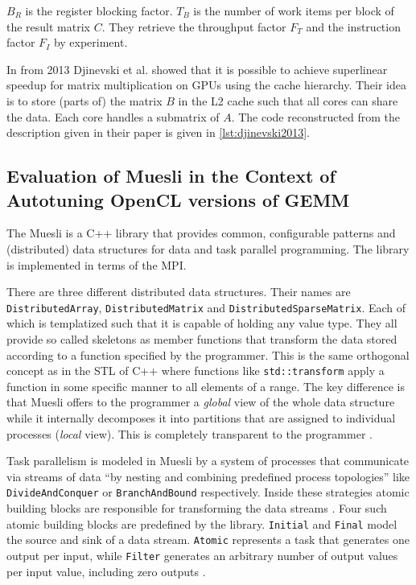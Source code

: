 $B_R$ is the register blocking factor. $T_B$ is the number of work items 
per block of the result matrix $C$. They retrieve the throughput factor $F_T$ 
and the instruction factor $F_I$ by experiment.



In \cite{Djinevski2013} from 2013 Djinevski et al. showed that it is possible 
to achieve superlinear speedup for matrix multiplication on \acp{GPU} using the 
cache hierarchy. Their idea is to store (parts of) the matrix $B$ in the L2 
cache such that all cores can share the data. Each core handles a submatrix of 
$A$. The code reconstructed from the description given in their paper is given 
in \cref{lst:djinevski2013}. 



\subsection{Evaluation of Muesli in the Context of Autotuning OpenCL 
versions of \acs{GEMM}}

The \ac{Muesli} is a C++ library that provides common, 
configurable patterns and (distributed) data structures for data and task 
parallel programming. The library is implemented in terms of the \ac{MPI}.

There are three different distributed data structures. Their names are 
\texttt{DistributedArray}, \texttt{DistributedMatrix} and 
\texttt{DistributedSparseMatrix}. Each of which is templatized such that it 
is capable of holding any value type. They all provide so called skeletons as 
member functions that transform the data stored according to a function 
specified by the programmer. This is the same orthogonal concept as in the 
\ac{STL} of C++ where functions like \texttt{std::transform} apply a function 
in some specific manner to all elements of a range. The key difference is that 
\ac{Muesli} offers to the programmer a \textit{global} view of the whole data 
structure while it internally decomposes it into partitions that are assigned 
to individual processes (\textit{local} view). This is completely transparent 
to the programmer \cite[Chapter 3.1]{Ciechanowicz2009}.

Task parallelism is modeled in \ac{Muesli} by a system of processes that 
communicate via streams of data ``by nesting and combining predefined process 
topologies'' like \texttt{DivideAndConquer} or \texttt{BranchAndBound} 
respectively. Inside these strategies atomic building blocks are responsible 
for transforming the data streams \cite[Chapter 4]{Ciechanowicz2009}. Four such 
atomic 
building blocks are predefined by the library. \texttt{Initial} and 
\texttt{Final} model the source and sink of a data stream. \texttt{Atomic} 
represents a task that generates one output per input, while \texttt{Filter} 
generates an arbitrary number of output values per input value, including zero 
outputs \cite[Chapter 4.1]{Ciechanowicz2009}.


